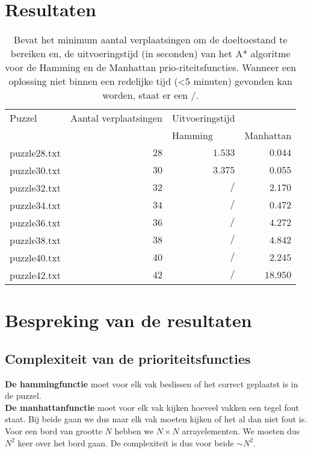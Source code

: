 \documentclass[a4paper]{article}
\numberwithin{equation}{section}
\begin{document}
    \pagebreak

    \section{Resultaten}
        \begin{table}[!ht]
            \centering
            \begin{tabular}{r r r r}
                \toprule
                \multicolumn{1}{l}{Puzzel} & \multicolumn{1}{l}{Aantal verplaatsingen} & \multicolumn{1}{l}{Uitvoeringstijd} &\\
                & &\multicolumn{1}{l}{Hamming}& \multicolumn{1}{l}{Manhattan} \\
                \midrule
                puzzle28.txt & $28$ & $1.533$ & $0.044$\\
                puzzle30.txt & $30$ & $3.375$ & $0.055$\\
                puzzle32.txt & $32$ & $/$ & $2.170$\\
                puzzle34.txt & $34$ & $/$ & $0.472$\\
                puzzle36.txt & $36$ & $/$ & $4.272$\\
                puzzle38.txt & $38$ & $/$ & $4.842$\\
                puzzle40.txt & $40$ & $/$ & $2.245$\\
                puzzle42.txt & $42$ & $/$ & $18.950$\\
                \bottomrule
            \end{tabular}
            \caption[Prestatie van het A* algoritme.]{Bevat het minimum aantal verplaatsingen om de doeltoestand te bereiken en,
               de uitvoeringstijd (in seconden) van het A* algoritme voor de Hamming en de Manhattan
                prio-riteitsfuncties. Wanneer een oplossing niet binnen een redelijke
                tijd (<5 minuten) gevonden kan worden, staat er een $/$.}
            \label{tab:Prestatie A*}
        \end{table}

    \pagebreak

    \section{Bespreking van de resultaten}
        \subsection{Complexiteit van de prioriteitsfuncties}
            \textbf{De hammingfunctie} moet voor elk vak beslissen of het correct geplaatst is in de puzzel.
            \\\textbf{De manhattanfunctie} moet voor elk vak kijken hoeveel vakken een tegel fout staat.
            Bij beide gaan we dus naar elk vak moeten kijken of het al dan niet fout is. 
            \\Voor een bord van grootte $N$ hebben we 
            $N \times N$ arrayelementen. We moeten dus $N^2$ keer over het bord gaan. De complexiteit is dus voor beide $\sim N^2$.
           
\end{document}
